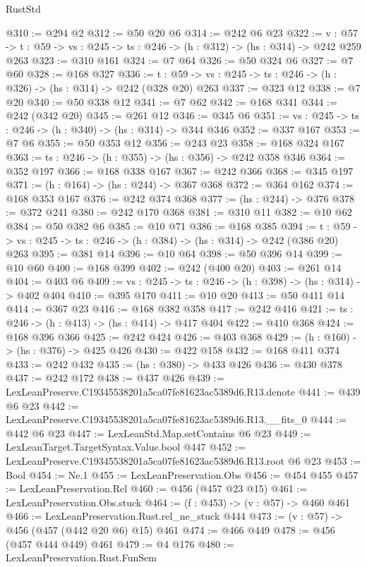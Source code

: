 \begin{lexlean}{RustStd}
\begin{coremodule}
@310 := @294 @2
@312 := @50 @20 @6
@314 := @242 @6 @23
@322 := {v : @57} ->
  {t : @59} -> {vs : @245} -> {ts : @246} -> (h : @312) -> (hs : @314) -> @242 @259 @263
@323 := @310 @161
@324 := @7 @64
@326 := @50 @324 @6
@327 := @7 @60
@328 := @168 @327
@336 := {t : @59} -> {vs : @245} -> {ts : @246} -> (h : @326) -> (hs : @314) -> @242 (@328 @20) @263
@337 := @323 @12
@338 := @7 @20
@340 := @50 @338 @12
@341 := @7 @62
@342 := @168 @341
@344 := @242 (@342 @20)
@345 := @261 @12
@346 := @345 @6
@351 := {vs : @245} -> {ts : @246} -> (h : @340) -> (hs : @314) -> @344 @346
@352 := @337 @167
@353 := @7 @6
@355 := @50 @353 @12
@356 := @243 @23
@358 := @168 @324 @167
@363 := {ts : @246} -> (h : @355) -> (hs : @356) -> @242 @358 @346
@364 := @352 @197
@366 := @168 @338 @167
@367 := @242 @366
@368 := @345 @197
@371 := (h : @164) -> (hs : @244) -> @367 @368
@372 := @364 @162
@374 := @168 @353 @167
@376 := @242 @374 @368
@377 := (hs : @244) -> @376
@378 := @372 @241
@380 := @242 @170 @368
@381 := @310 @11
@382 := @10 @62
@384 := @50 @382 @6
@385 := @10 @71
@386 := @168 @385
@394 := {t : @59} -> {vs : @245} -> {ts : @246} -> (h : @384) -> (hs : @314) -> @242 (@386 @20) @263
@395 := @381 @14
@396 := @10 @64
@398 := @50 @396 @14
@399 := @10 @60
@400 := @168 @399
@402 := @242 (@400 @20)
@403 := @261 @14
@404 := @403 @6
@409 := {vs : @245} -> {ts : @246} -> (h : @398) -> (hs : @314) -> @402 @404
@410 := @395 @170
@411 := @10 @20
@413 := @50 @411 @14
@414 := @367 @23
@416 := @168 @382 @358
@417 := @242 @416
@421 := {ts : @246} -> (h : @413) -> (hs : @414) -> @417 @404
@422 := @410 @368
@424 := @168 @396 @366
@425 := @242 @424
@426 := @403 @368
@429 := (h : @160) -> (hs : @376) -> @425 @426
@430 := @422 @158
@432 := @168 @411 @374
@433 := @242 @432
@435 := (hs : @380) -> @433 @426
@436 := @430 @378
@437 := @242 @172
@438 := @437 @426
@439 := LexLeanPreserve.C19345538201a5ca07fe81623ac5389d6.R13.denote
@441 := @439 @6 @23
@442 := LexLeanPreserve.C19345538201a5ca07fe81623ac5389d6.R13.__fits_0
@444 := @442 @6 @23
@447 := LexLeanStd.Map.setContains @6 @23
@449 := LexLeanTarget.TargetSyntax.Value.bool @447
@452 := LexLeanPreserve.C19345538201a5ca07fe81623ac5389d6.R13.root @6 @23
@453 := Bool
@454 := Ne.{1}
@455 := LexLeanPreservation.Obs
@456 := @454 @455
@457 := LexLeanPreservation.Rel
@460 := @456 (@457 @23 @15)
@461 := LexLeanPreservation.Obs.stuck
@464 := (f : @453) -> (v : @57) -> @460 @461
@466 := LexLeanPreservation.Rust.rel_ne_stuck @444
@473 := (v : @57) -> @456 (@457 (@442 @20 @6) @15) @461
@474 := @466 @449
@478 := @456 (@457 @444 @449) @461
@479 := @4 @176
@480 := LexLeanPreservation.Rust.FunSem

\end{coremodule}
\end{lexlean}
